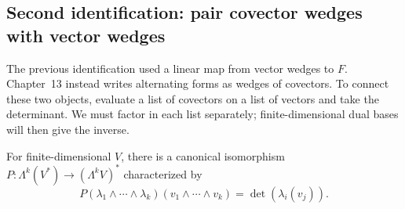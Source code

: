 \subsection{Second identification: pair covector wedges with vector wedges}

The previous identification used a linear map from vector wedges to $F$.
Chapter~13 instead writes alternating forms as wedges of covectors.
To connect these two objects, evaluate a list of covectors on a list of
vectors and take the determinant. We must factor in each list separately;
finite-dimensional dual bases will then give the inverse.

\begin{theorem}\label{thm:exterior-duality}
For finite-dimensional $V$, there is a canonical isomorphism
$P:\Lambda^k(V^*)\to(\Lambda^kV)^*$ characterized by
\[
P(\lambda_1\wedge\cdots\wedge\lambda_k)
(v_1\wedge\cdots\wedge v_k)=\det(\lambda_i(v_j)).
\]
\end{theorem}
